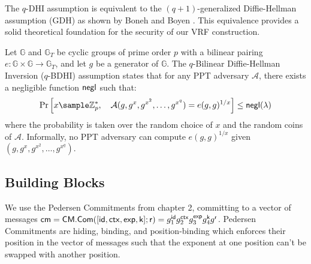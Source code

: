 \begin{remark}
The $q$-DHI assumption is equivalent to the $(q+1)$-generalized Diffie-Hellman assumption (GDH) as shown by Boneh and Boyen \cite{kanade_efficient_2004}. This equivalence provides a solid theoretical foundation for the security of our VRF construction.
\end{remark}



\begin{definition}
Let $\mathbb{G}$ and $\mathbb{G}_T$ be cyclic groups of prime order $p$ with a bilinear pairing $e: \mathbb{G} \times \mathbb{G} \to \mathbb{G}_T$, and let $g$ be a generator of $\mathbb{G}$. The $q$-Bilinear Diffie-Hellman Inversion ($q$-BDHI) assumption states that for any PPT adversary $\mathcal{A}$, there exists a negligible function $\mathsf{negl}$ such that:
\[
\Pr\left[ x \sample \mathbb{Z}_p^*, \quad \mathcal{A}(g, g^x, g^{x^2}, \ldots, g^{x^q}) = e(g, g)^{1/x} \right] \leq \negl(\lambda)
\]
where the probability is taken over the random choice of $x$ and the random coins of $\mathcal{A}$. Informally, no PPT adversary can compute $e(g, g)^{1/x}$ given $(g, g^x, g^{x^2}, \ldots, g^{x^q})$.
\end{definition}




\subsection{Building Blocks}
We use the Pedersen Commitments from chapter 2, committing to a vector of messages $\mathsf{cm} = \mathsf{CM.Com}([\mathsf{id}, \mathsf{ctx}, \mathsf{exp}, \mathsf{k}];\mathsf{r}) = g_1^{\mathsf{id}} g_2^{\mathsf{ctx}} g_3^{\mathsf{exp}} g_4^{\mathsf{k}} g^{\mathsf{r}}$. Pedersen Commitments are hiding, binding, and position-binding which enforces their position in the vector of messages such that the exponent at one position can't be swapped with another position. 






